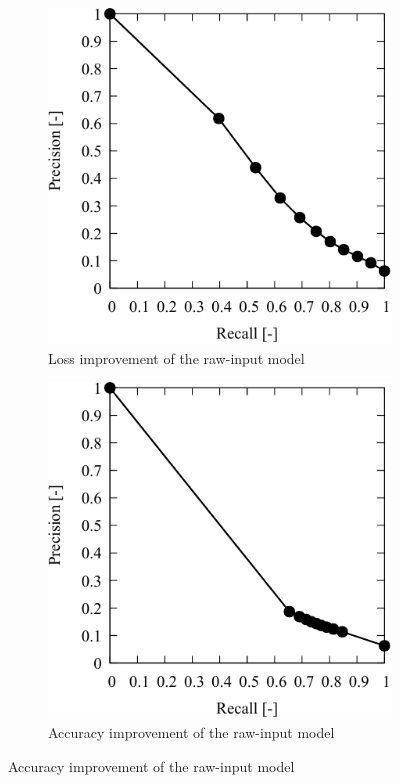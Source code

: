 \begin{figure}[H]
    \centering
    \begin{subfigure}[t]{0.45\linewidth}
        \includegraphics[width=\linewidth]{./Figure/4_Results/training/sresult/prcurve.pdf}
        \caption{Loss improvement of the raw-input model}
        \label{fig:prcurve:s}
    \end{subfigure}
    \hfill
    \begin{subfigure}[t]{0.45\linewidth}
        \includegraphics[width=\linewidth]{./Figure/4_Results/training/xlresult/prcurve.pdf}
        \caption{Accuracy improvement of the raw-input model}
        \label{fig:prcurve:xl}
    \end{subfigure}


\end{figure}
